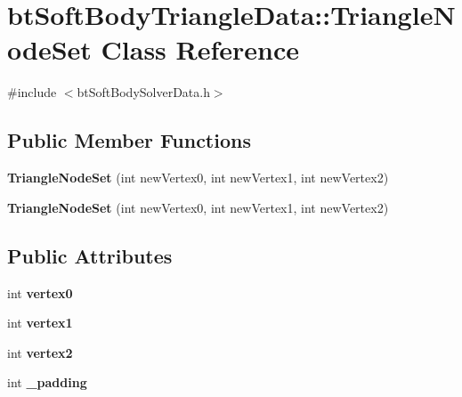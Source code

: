 \hypertarget{classbtSoftBodyTriangleData_1_1TriangleNodeSet}{}\section{bt\+Soft\+Body\+Triangle\+Data\+:\+:Triangle\+Node\+Set Class Reference}
\label{classbtSoftBodyTriangleData_1_1TriangleNodeSet}


{\ttfamily \#include $<$bt\+Soft\+Body\+Solver\+Data.\+h$>$}

\subsection*{Public Member Functions}
\begin{DoxyCompactItemize}
\item 
\mbox{\label{classbtSoftBodyTriangleData_1_1TriangleNodeSet_a6a464df5e373dc8f072b40e43349d69b}} 
{\bfseries Triangle\+Node\+Set} (int new\+Vertex0, int new\+Vertex1, int new\+Vertex2)
\item 
\mbox{\label{classbtSoftBodyTriangleData_1_1TriangleNodeSet_a6a464df5e373dc8f072b40e43349d69b}} 
{\bfseries Triangle\+Node\+Set} (int new\+Vertex0, int new\+Vertex1, int new\+Vertex2)
\end{DoxyCompactItemize}
\subsection*{Public Attributes}
\begin{DoxyCompactItemize}
\item 
\mbox{\label{classbtSoftBodyTriangleData_1_1TriangleNodeSet_ae327dfa7eb0f95a9eb748e5ab650fa67}} 
int {\bfseries vertex0}
\item 
\mbox{\label{classbtSoftBodyTriangleData_1_1TriangleNodeSet_af627427de3ce716fd58e408efbd2bc8a}} 
int {\bfseries vertex1}
\item 
\mbox{\label{classbtSoftBodyTriangleData_1_1TriangleNodeSet_a7f68be6c536c4bd9bc2863e2a8e15b90}} 
int {\bfseries vertex2}
\item 
\mbox{\label{classbtSoftBodyTriangleData_1_1TriangleNodeSet_a08d49c73c1098c41f0bbc1b7d874b765}} 
int {\bfseries \+\_\+padding}
\end{DoxyCompactItemize}


